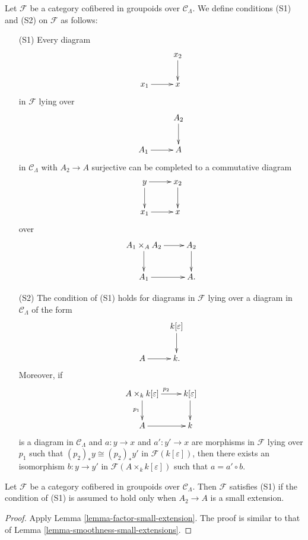 \begin{definition}
\label{definition-S1-S2}
Let $\mathcal F$ be a category cofibered in groupoids over $\mathcal 
C_{\Lambda}$. We define conditions (S1) and (S2) on $\mathcal F$ as follows:
\begin{enumerate}
\item[(S1)] Every diagram
\[
\xymatrix{
           & x_2 \ar[d] \\
x_1 \ar[r] & x   
}
\]
in $\mathcal F$ lying over
\[
\xymatrix{
           & A_2 \ar[d] \\
A_1 \ar[r] & A   
}
\]  
in $\mathcal C_{\Lambda}$ with $A_2 \rightarrow A$ surjective can be completed 
to a commutative diagram
\[
\xymatrix{
y \ar[r] \ar[d] & x_2 \ar[d] \\
x_1 \ar[r]      & x   
}
\]
over
\[
\xymatrix{
A_1 \times_{A} A_2 \ar[r] \ar[d] & A_2 \ar[d] \\ 
A_1 \ar[r]      & A.   
}
\]

\item[(S2)] The condition of (S1) holds for diagrams in $\mathcal F$ lying over 
a diagram in $\mathcal C_{\Lambda}$ of the form
\[
\xymatrix{
          & k[\varepsilon] \ar[d] \\
A  \ar[r] & k . 
}
\]  
Moreover, if
\[
\xymatrix{
A \times_{k} k[\varepsilon]  \ar[r]^{p_2} \ar[d]_{p_1}  & k[\varepsilon] \ar[d] 
\\
A  \ar[r] & k 
}
\]  
is a diagram in $\mathcal C_{\Lambda}$ and $a: y \rightarrow x$ and $a': y' 
\rightarrow x$ are morphisms in $\mathcal F$ lying over $p_{1}$ such that 
$(p_2)_{*}y \cong (p_2)_{*}y'$ in $\mathcal F(k[\varepsilon])$, then there 
exists an isomorphism $b: y \rightarrow y'$ in $\mathcal F(A \times_{k} 
k[\varepsilon])$ such that $a = a' \circ b$.
\end{enumerate}
\end{definition}

\begin{lemma}
\label{lemma-S1-small-extensions}
Let $\mathcal F$ be a category cofibered in groupoids over $\mathcal 
C_{\Lambda}$. Then $\mathcal F$ satisfies \textnormal{(S1)} if the condition of 
\textnormal{(S1)} is assumed to hold only when $A_2 \rightarrow A$ is a small 
extension.
\end{lemma}

\begin{proof}
Apply Lemma \ref{lemma-factor-small-extension}.  The proof is similar to that 
of Lemma \ref{lemma-smoothness-small-extensions}.
\end{proof}

